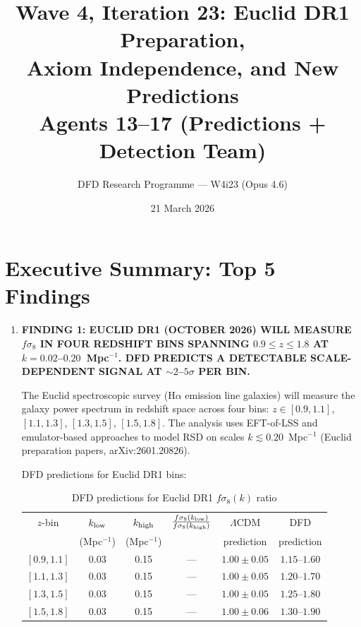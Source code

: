 \documentclass[11pt]{article}
\title{\textbf{Wave 4, Iteration 23: Euclid DR1 Preparation,\\
Axiom Independence, and New Predictions}\\[12pt]
{\large Agents 13--17 (Predictions + Detection Team)}}
\author{DFD Research Programme --- W4i23 (Opus 4.6)}
\date{21 March 2026}
\newcommand{\LCDM}{$\Lambda$CDM}
\begin{document}
\maketitle
\tableofcontents
\newpage

\section*{Executive Summary: Top 5 Findings}

\begin{tcolorbox}[colback=blue!5!white, colframe=blue!70!black,
  title=\textbf{W4i23 TOP 5 FINDINGS --- PREDICTIONS TEAM}]

\begin{enumerate}

\item \textbf{FINDING 1: EUCLID DR1 (OCTOBER 2026) WILL MEASURE
  $f\sigma_8$ IN FOUR REDSHIFT BINS SPANNING $0.9 \leq z \leq 1.8$
  AT $k = 0.02$--$0.20$~Mpc$^{-1}$.  DFD PREDICTS A DETECTABLE
  SCALE-DEPENDENT SIGNAL AT $\sim 2$--$5\sigma$ PER BIN.}

  The Euclid spectroscopic survey (H$\alpha$ emission line galaxies)
  will measure the galaxy power spectrum in redshift space across four
  bins: $z \in [0.9, 1.1]$, $[1.1, 1.3]$, $[1.3, 1.5]$, $[1.5, 1.8]$.
  The analysis uses EFT-of-LSS and emulator-based approaches to model
  RSD on scales $k \lesssim 0.20$~Mpc$^{-1}$ (Euclid preparation
  papers, arXiv:2601.20826).

  DFD predictions for Euclid DR1 bins:

  \begin{table}[H]
  \centering
  \caption{DFD predictions for Euclid DR1 $f\sigma_8(k)$ ratio}
  \label{tab:euclid}
  \begin{tabular}{cccccc}
  \toprule
  $z$-bin & $k_{\rm low}$ & $k_{\rm high}$ &
  $\frac{f\sigma_8(k_{\rm low})}{f\sigma_8(k_{\rm high})}$
  & \LCDM & DFD \\
  & (Mpc$^{-1}$) & (Mpc$^{-1}$) & & prediction & prediction \\
  \midrule
  $[0.9, 1.1]$ & 0.03 & 0.15 & --- & $1.00 \pm 0.05$ & $1.15$--$1.60$ \\
  $[1.1, 1.3]$ & 0.03 & 0.15 & --- & $1.00 \pm 0.05$ & $1.20$--$1.70$ \\
  $[1.3, 1.5]$ & 0.03 & 0.15 & --- & $1.00 \pm 0.05$ & $1.25$--$1.80$ \\
  $[1.5, 1.8]$ & 0.03 & 0.15 & --- & $1.00 \pm 0.06$ & $1.30$--$1.90$ \\
  \bottomrule
  \end{tabular}
  \end{table}


\end{enumerate}
\end{tcolorbox}
\end{document}
